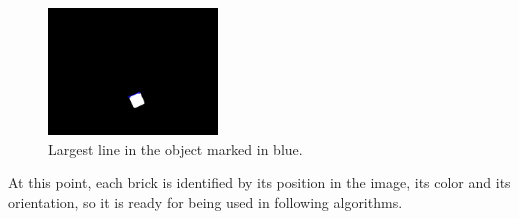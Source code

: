 \begin{figure}[H]
    \includegraphics[width=0.4\textwidth]{figures/object.png}
    \caption{Largest line in the object marked in blue.}
    \label{fig:object}
\end{figure}

At this point, each brick is identified by its position in the image, its color and its orientation, so it is ready for being used in following algorithms.
